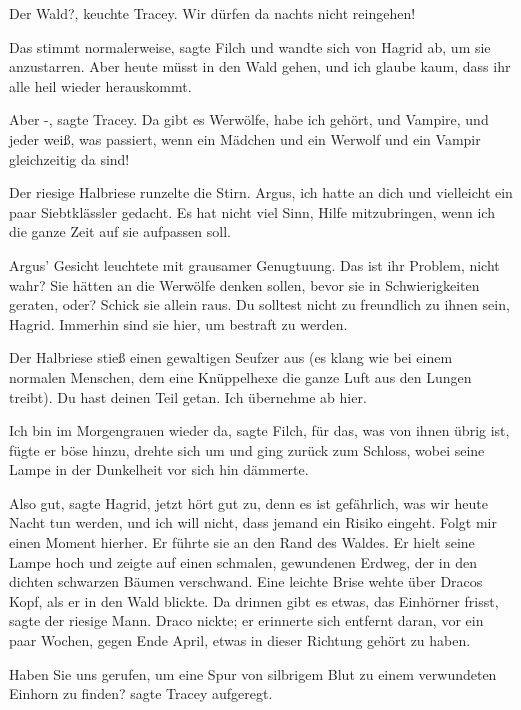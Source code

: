 \glqq{}Der Wald?\grqq{}, keuchte Tracey. \glqq{}Wir dürfen da nachts nicht
reingehen!\grqq{}

\glqq{}Das stimmt normalerweise\grqq{}, sagte Filch und wandte sich von Hagrid
ab, um sie anzustarren. \glqq{}Aber heute müsst in den Wald gehen, und ich
glaube kaum, dass ihr alle heil wieder herauskommt.\grqq{}

\glqq{}Aber -\grqq{}, sagte Tracey. \glqq{}Da gibt es Werwölfe, habe ich gehört,
und Vampire, und jeder weiß, was passiert, wenn ein Mädchen und ein
Werwolf und ein Vampir gleichzeitig da sind!\grqq{}

Der riesige Halbriese runzelte die Stirn. \glqq{}Argus, ich hatte an dich und
vielleicht ein paar Siebtklässler gedacht. Es hat nicht viel Sinn, Hilfe
mitzubringen, wenn ich die ganze Zeit auf sie aufpassen soll.\grqq{}

Argus' Gesicht leuchtete mit grausamer Genugtuung. \glqq{}Das ist ihr Problem,
nicht wahr? Sie hätten an die Werwölfe denken sollen, bevor sie in
Schwierigkeiten geraten, oder? Schick sie allein raus. Du solltest nicht
zu freundlich zu ihnen sein, Hagrid. Immerhin sind sie hier, um bestraft
zu werden.\grqq{}

Der Halbriese stieß einen gewaltigen Seufzer aus (es klang wie bei einem
normalen Menschen, dem eine Knüppelhexe die ganze Luft aus den Lungen
treibt). \glqq{}Du hast deinen Teil getan. Ich übernehme ab hier.\grqq{}

\glqq{}Ich bin im Morgengrauen wieder da\grqq{}, sagte Filch, \glqq{}für das, was
von ihnen übrig ist\grqq{}, fügte er böse hinzu, drehte sich um und ging
zurück zum Schloss, wobei seine Lampe in der Dunkelheit vor sich hin
dämmerte.

\glqq{}Also gut\grqq{}, sagte Hagrid, \glqq{}jetzt hört gut zu, denn es ist
gefährlich, was wir heute Nacht tun werden, und ich will nicht, dass
jemand ein Risiko eingeht. Folgt mir einen Moment hierher.\grqq{} Er
führte sie an den Rand des Waldes. Er hielt seine Lampe hoch und zeigte
auf einen schmalen, gewundenen Erdweg, der in den dichten schwarzen
Bäumen verschwand. Eine leichte Brise wehte über Dracos Kopf, als er in
den Wald blickte. \glqq{}Da drinnen gibt es etwas, das Einhörner
frisst\grqq{}, sagte der riesige Mann. Draco nickte; er erinnerte sich
entfernt daran, vor ein paar Wochen, gegen Ende April, etwas in dieser
Richtung gehört zu haben.

\glqq{}Haben Sie uns gerufen, um eine Spur von silbrigem Blut zu einem
verwundeten Einhorn zu finden?\grqq{} sagte Tracey aufgeregt.

